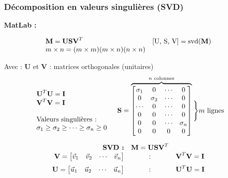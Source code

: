 \documentclass[document.tex]{subfiles}
\begin{document}

\subsubsection{Décomposition en valeurs singulières (SVD)}

\textbf{MatLab :} 

$$ \begin{array}{l l}
\textbf{M} = \textbf{U} \textbf{S} \textbf{V}^T & [\text{U, S, V}]=\text{svd}(\textbf{M}) \\
m \times n  = (m \times m)(m \times n)(n \times n)
\end{array} $$

Avec : \textbf{U} et \textbf{V} : matrices orthogonales (unitaires)
$$ \begin{array}{c c}
\begin{array}{l}
\textbf{U}^T \textbf{U} = \textbf{I} \\
\textbf{V}^T \textbf{V} = \textbf{I} \\
\; \\
\text{Valeurs singulières :} \\
\sigma_1 \geq \sigma_2 \geq \cdots \geq \sigma_n \geq 0
\end{array} & \textbf{S} = \overbrace{\begin{bmatrix}
\sigma_1 & 0 & \cdots & 0 \\ 0 & \sigma_2 & \cdots & 0 \\ \cdots & 0 & \cdots & 0 \\ 0 & 0 & \cdots & 0 \\ 0 & 0 & \cdots & \sigma_n \\ 0 & 0 & 0 & 0 \end{bmatrix}}^{n \text{ colonnes}}\Bigg\rbrace m \text{ lignes}
\end{array} $$

$$
\begin{array}{r c l}
\textbf{SVD :} &\textbf{M} = \textbf{U}\textbf{S}\textbf{V}^T \\
\textbf{V} = \begin{bmatrix} \vec{v}_1 & \vec{v}_2 & \cdots & \vec{v}_n \end{bmatrix} & : &\textbf{V}^T\textbf{V}=\textbf{I} \\[6pt]
\textbf{U} = \begin{bmatrix} \vec{u}_1 & \vec{u}_2 & \cdots & \vec{u}_n \end{bmatrix} & : & \textbf{U}^T\textbf{U}=\textbf{I}
\end{array}
$$
\end{document}
